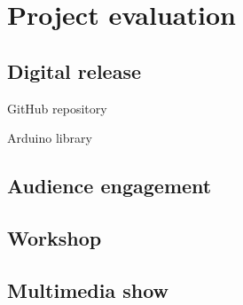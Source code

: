 \chapter{Project evaluation}

\section{Digital release}

GitHub repository

Arduino library

\section{Audience engagement}

\section{Workshop}

\section{Multimedia show}
